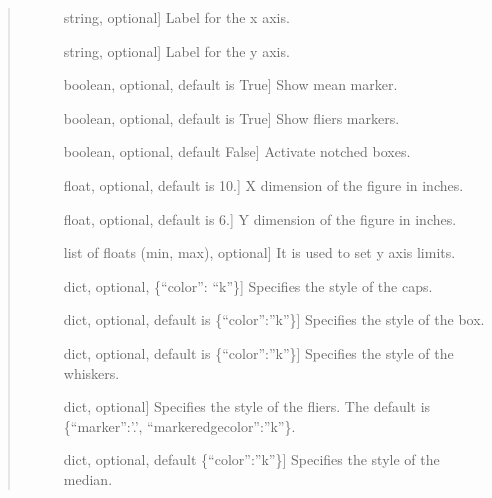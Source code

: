\documentclass[letterpaper,10pt,english]{sphinxmanual}
\begin{document}
\begin{fulllineitems}
\begin{quote}
\begin{description}
\begin{description}
\item[{}] \leavevmode{[}string, optional{]}
Label for the x axis.

\item[{}] \leavevmode{[}string, optional{]}
Label for the y axis.

\item[{}] \leavevmode{[}boolean, optional, default is True{]}
Show mean marker.

\item[{}] \leavevmode{[}boolean, optional, default is True{]}
Show fliers markers.

\item[{}] \leavevmode{[}boolean, optional, default False{]}
Activate notched boxes.

\item[{}] \leavevmode{[}float, optional, default is 10.{]}
X dimension of the figure in inches.

\item[{}] \leavevmode{[}float, optional, default is 6.{]}
Y dimension of the figure in inches.

\item[{}] \leavevmode{[}list of floats (min, max), optional{]}
It is used to set y axis limits.

\item[{}] \leavevmode{[}dict, optional, \{“color”: “k”\}{]}
Specifies the style of the caps.

\item[{}] \leavevmode{[}dict, optional, default is \{“color”:”k”\}{]}
Specifies the style of the box.

\item[{}] \leavevmode{[}dict, optional, default is \{“color”:”k”\}{]}
Specifies the style of the whiskers.

\item[{}] \leavevmode{[}dict, optional{]}
Specifies the style of the fliers. 
The default is \{“marker”:’.’, “markeredgecolor”:”k”\}.

\item[{}] \leavevmode{[}dict, optional, default \{“color”:”k”\}{]}
Specifies the style of the median.


\end{description}
\end{description}
\end{quote}
\end{fulllineitems}
\end{document}
